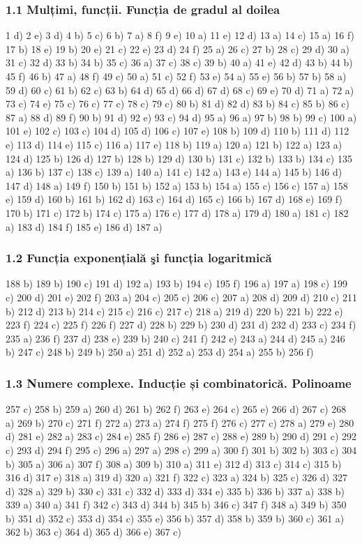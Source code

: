 \documentclass[11pt]{article}
\begin{document}
\subsubsection*{1.1 Mulțimi, funcții. Funcția de gradul al doilea}
1 d) 2 e) 3 d) 4 b) 5 c) 6 b) 7 a) 8 f) 9 e) 10 a) 11 e) 12 d) 13 a) 14 c) 15 a) 16 f) 17 b) 18 e) 19 b) 20 e) 21 c) 22 e) 23 d) 24 f) 25 a) 26 c) 27 b) 28 c) 29 d) 30 a) 31 c) 32 d) 33 b) 34 b) 35 c) 36 a) 37 c) 38 c) 39 b) 40 a) 41 e) 42 d) 43 b) 44 b) 45 f) 46 b) 47 a) 48 f) 49 c) 50 a) 51 c) 52 f) 53 e) 54 a) 55 e) 56 b) 57 b) 58 a) 59 d) 60 c) 61 b) 62 c) 63 b) 64 d) 65 d) 66 d) 67 d) 68 c) 69 e) 70 d) 71 a) 72 a) 73 c) 74 e) 75 c) 76 c) 77 c) 78 c) 79 c) 80 b) 81 d) 82 d) 83 b) 84 c) 85 b) 86 c) 87 a) 88 d) 89 f) 90 b) 91 d) 92 e) 93 c) 94 d) 95 a) 96 a) 97 b) 98 b) 99 c) 100 a) 101 e) 102 c) 103 c) 104 d) 105 d) 106 c) 107 e) 108 b) 109 d) 110 b) 111 d) 112 e) 113 d) 114 e) 115 c) 116 a) 117 e) 118 b) 119 a) 120 a) 121 b) 122 a) 123 a) 124 d) 125 b) 126 d) 127 b) 128 b) 129 d) 130 b) 131 c) 132 b) 133 b) 134 c) 135 a) 136 b) 137 c) 138 c) 139 a) 140 a) 141 c) 142 a) 143 e) 144 a) 145 b) 146 d) 147 d) 148 a) 149 f) 150 b) 151 b) 152 a) 153 b) 154 a) 155 c) 156 c) 157 a) 158 e) 159 d) 160 b) 161 b) 162 d) 163 c) 164 d) 165 c) 166 b) 167 d) 168 e) 169 f) 170 b) 171 c) 172 b) 174 c) 175 a) 176 c) 177 d) 178 a) 179 d) 180 a) 181 c) 182 a) 183 d) 184 f) 185 e) 186 d) 187 a)

\subsubsection*{1.2 Funcția exponențială şi funcția logaritmică}
188 b) 189 b) 190 c) 191 d) 192 a) 193 b) 194 c) 195 f) 196 a) 197 a) 198 c) 199 c) 200 d) 201 e) 202 f) 203 a) 204 c) 205 c) 206 c) 207 a) 208 d) 209 d) 210 c) 211 b) 212 d) 213 b) 214 c) 215 c) 216 c) 217 c) 218 a) 219 d) 220 b) 221 b) 222 e) 223 f) 224 c) 225 f) 226 f) 227 d) 228 b) 229 b) 230 d) 231 d) 232 d) 233 c) 234 f) 235 a) 236 f) 237 d) 238 e) 239 b) 240 c) 241 f) 242 e) 243 a) 244 d) 245 a) 246 b) 247 c) 248 b) 249 b) 250 a) 251 d) 252 a) 253 d) 254 a) 255 b) 256 f)

\subsubsection*{1.3 Numere complexe. Inducție și combinatorică. Polinoame}
257 c) 258 b) 259 a) 260 d) 261 b) 262 f) 263 e) 264 c) 265 e) 266 d) 267 c) 268 a) 269 b) 270 c) 271 f) 272 a) 273 a) 274 f) 275 f) 276 c) 277 c) 278 a) 279 e) 280 d) 281 e) 282 a) 283 c) 284 e) 285 f) 286 e) 287 c) 288 e) 289 b) 290 d) 291 c) 292 c) 293 d) 294 f) 295 c) 296 a) 297 a) 298 c) 299 a) 300 f) 301 b) 302 b) 303 c) 304 b) 305 a) 306 a) 307 f) 308 a) 309 b) 310 a) 311 e) 312 d) 313 c) 314 c) 315 b) 316 d) 317 e) 318 a) 319 d) 320 a) 321 f) 322 c) 323 a) 324 b) 325 c) 326 d) 327 d) 328 a) 329 b) 330 c) 331 c) 332 d) 333 d) 334 e) 335 b) 336 b) 337 a) 338 b) 339 a) 340 a) 341 f) 342 c) 343 d) 344 b) 345 b) 346 c) 347 f) 348 a) 349 b) 350 b) 351 d) 352 c) 353 d) 354 c) 355 e) 356 b) 357 d) 358 b) 359 b) 360 c) 361 a) 362 b) 363 c) 364 d) 365 d) 366 e) 367 c)
\end{document}
